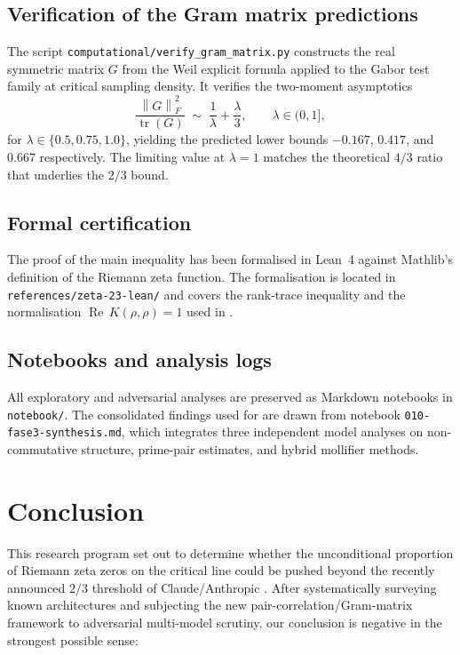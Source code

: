 \documentclass[11pt,a4paper]{article}
\theoremstyle{definition}
\theoremstyle{remark}
\newcommand{\tr}{\operatorname{tr}}
\newcommand{\norm}[1]{\left\|{#1}\right\|}
\begin{document}
\subsection{Verification of the Gram matrix predictions}

The script \texttt{computational/verify\_gram\_matrix.py} constructs the real symmetric matrix $G$ from the Weil explicit formula applied to the Gabor test family at critical sampling density. It verifies the two-moment asymptotics
\[
\frac{\norm{G}_F^2}{\tr(G)} \;\sim\; \frac{1}{\lambda} + \frac{\lambda}{3}, \qquad \lambda \in (0,1],
\]
for $\lambda \in \{0.5, 0.75, 1.0\}$, yielding the predicted lower bounds $-0.167$, $0.417$, and $0.667$ respectively. The limiting value at $\lambda=1$ matches the theoretical $4/3$ ratio that underlies the $2/3$ bound.

\subsection{Formal certification}

The proof of the main inequality has been formalised in Lean~4 against Mathlib's definition of the Riemann zeta function. The formalisation is located in \texttt{references/zeta-23-lean/} and covers the rank-trace inequality and the normalisation $\operatorname{Re}\,K(\rho,\rho)=1$ used in .

\subsection{Notebooks and analysis logs}

All exploratory and adversarial analyses are preserved as Markdown notebooks in \texttt{notebook/}. The consolidated findings used for  are drawn from notebook \texttt{010-fase3-synthesis.md}, which integrates three independent model analyses on non-commutative structure, prime-pair estimates, and hybrid mollifier methods.

\section{Conclusion}
\label{sec:conclusion}

This research program set out to determine whether the unconditional proportion of Riemann zeta zeros on the critical line could be pushed beyond the recently announced $2/3$ threshold of Claude/Anthropic \cite{ClaudeAnthropic2026}. After systematically surveying known architectures and subjecting the new pair-correlation/Gram-matrix framework to adversarial multi-model scrutiny, our conclusion is negative in the strongest possible sense:
\end{document}
